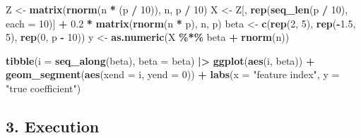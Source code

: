 \documentclass[
]{article}
\newenvironment{Shaded}{\begin{snugshade}}{\end{snugshade}}
\newcommand{\AttributeTok}[1]{\textcolor[rgb]{0.13,0.29,0.53}{#1}}
\newcommand{\DecValTok}[1]{\textcolor[rgb]{0.00,0.00,0.81}{#1}}
\newcommand{\FloatTok}[1]{\textcolor[rgb]{0.00,0.00,0.81}{#1}}
\newcommand{\FunctionTok}[1]{\textcolor[rgb]{0.13,0.29,0.53}{\textbf{#1}}}
\newcommand{\NormalTok}[1]{#1}
\newcommand{\OtherTok}[1]{\textcolor[rgb]{0.56,0.35,0.01}{#1}}
\newcommand{\SpecialCharTok}[1]{\textcolor[rgb]{0.81,0.36,0.00}{\textbf{#1}}}
\newcommand{\StringTok}[1]{\textcolor[rgb]{0.31,0.60,0.02}{#1}}
\begin{document}
\begin{Shaded}
\begin{Highlighting}[]
\NormalTok{Z }\OtherTok{\textless{}{-}} \FunctionTok{matrix}\NormalTok{(}\FunctionTok{rnorm}\NormalTok{(n }\SpecialCharTok{*}\NormalTok{ (p }\SpecialCharTok{/} \DecValTok{10}\NormalTok{)), n, p }\SpecialCharTok{/} \DecValTok{10}\NormalTok{)}
\NormalTok{X }\OtherTok{\textless{}{-}}\NormalTok{ Z[, }\FunctionTok{rep}\NormalTok{(}\FunctionTok{seq\_len}\NormalTok{(p }\SpecialCharTok{/} \DecValTok{10}\NormalTok{), }\AttributeTok{each =} \DecValTok{10}\NormalTok{)] }\SpecialCharTok{+} \FloatTok{0.2} \SpecialCharTok{*} \FunctionTok{matrix}\NormalTok{(}\FunctionTok{rnorm}\NormalTok{(n }\SpecialCharTok{*}\NormalTok{ p), n, p)}
\NormalTok{beta }\OtherTok{\textless{}{-}} \FunctionTok{c}\NormalTok{(}\FunctionTok{rep}\NormalTok{(}\DecValTok{2}\NormalTok{, }\DecValTok{5}\NormalTok{), }\FunctionTok{rep}\NormalTok{(}\SpecialCharTok{{-}}\FloatTok{1.5}\NormalTok{, }\DecValTok{5}\NormalTok{), }\FunctionTok{rep}\NormalTok{(}\DecValTok{0}\NormalTok{, p }\SpecialCharTok{{-}} \DecValTok{10}\NormalTok{))}
\NormalTok{y }\OtherTok{\textless{}{-}} \FunctionTok{as.numeric}\NormalTok{(X }\SpecialCharTok{\%*\%}\NormalTok{ beta }\SpecialCharTok{+} \FunctionTok{rnorm}\NormalTok{(n))}

\FunctionTok{tibble}\NormalTok{(}\AttributeTok{i =} \FunctionTok{seq\_along}\NormalTok{(beta), }\AttributeTok{beta =}\NormalTok{ beta) }\SpecialCharTok{|\textgreater{}}
  \FunctionTok{ggplot}\NormalTok{(}\FunctionTok{aes}\NormalTok{(i, beta)) }\SpecialCharTok{+} \FunctionTok{geom\_segment}\NormalTok{(}\FunctionTok{aes}\NormalTok{(}\AttributeTok{xend =}\NormalTok{ i, }\AttributeTok{yend =} \DecValTok{0}\NormalTok{)) }\SpecialCharTok{+}
  \FunctionTok{labs}\NormalTok{(}\AttributeTok{x =} \StringTok{"feature index"}\NormalTok{, }\AttributeTok{y =} \StringTok{"true coefficient"}\NormalTok{)}
\end{Highlighting}
\end{Shaded}

\subsection{3. Execution}\label{execution}
\end{document}
